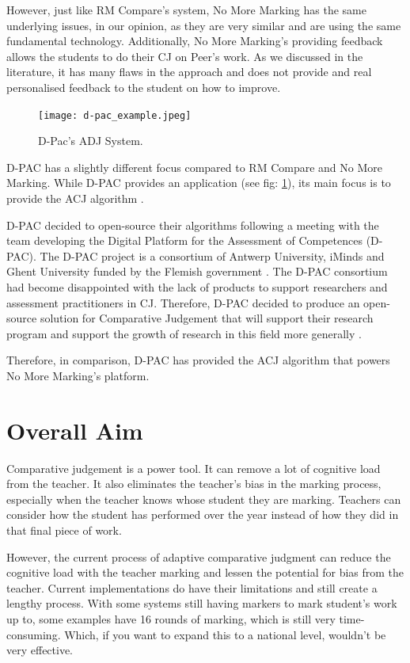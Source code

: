 		However, just like RM Compare's system, No More Marking has the same underlying issues, in our opinion, as they are very similar and are using the same fundamental technology. Additionally, No More Marking's providing feedback allows the students to do their CJ on Peer's work. As we discussed in the literature, it has many flaws in the approach and does not provide and real personalised feedback to the student on how to improve.  
	
	
		\begin{figure}[t]
			\centering
			\texttt{[image: d-pac\_example.jpeg]}
			\caption{D-Pac's ADJ System.}
			\label{fig:d-pac_ex}
			
		\end{figure}
	
		D-PAC has a slightly different focus compared to RM Compare and No More Marking. While D-PAC provides an application (see fig: \ref{fig:d-pac_ex}), its main focus is to provide the ACJ algorithm \cite{d-pac_blog,d-pac_gh}.
		
		D-PAC decided to open-source their algorithms following a meeting with the team developing the Digital Platform for the Assessment of Competences (D-PAC). The D-PAC project is a consortium of Antwerp University, iMinds and Ghent University funded by the Flemish government \cite{d-pac_blog}. The D-PAC consortium had become disappointed with the lack of products to support researchers and assessment practitioners in CJ. Therefore, D-PAC decided to produce an open-source solution for Comparative Judgement that will support their research program and support the growth of research in this field more generally \cite{d-pac_blog}.
		
		Therefore, in comparison, D-PAC has provided the ACJ algorithm that powers No More Marking's platform.

	
	\section{Overall Aim}
		Comparative judgement is a power tool. It can remove a lot of cognitive load from the teacher. It also eliminates the teacher's bias in the marking process, especially when the teacher knows whose student they are marking. Teachers can consider how the student has performed over the year instead of how they did in that final piece of work.
		
		However, the current process of adaptive comparative judgment can reduce the cognitive load with the teacher marking and lessen the potential for bias from the teacher. Current implementations do have their limitations and still create a lengthy process. With some systems still having markers to mark student's work up to, some examples have 16 rounds of marking, which is still very time-consuming. Which, if you want to expand this to a national level, wouldn't be very effective.
		

